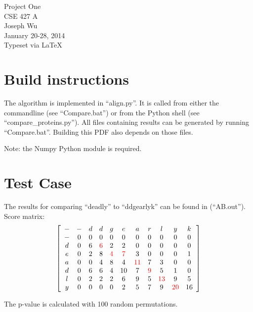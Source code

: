 \documentclass[a4paper, 12pt]{report}
\begin{document}
    \begin{center}
        {\LARGE Project One} \\
        CSE 427 A \\
        Joseph Wu  \\
        January 20-28, 2014 \\
        {\tiny Typeset via \LaTeX}
    \end{center}
    
\section{Build instructions}
    The algorithm is implemented in ``align.py''.  
    It is called from either the commandline (see ``Compare.bat'') 
        or from the Python shell (see ``compare\_proteins.py'').
    All files containing results can be generated by running ``Compare.bat''.
    Building this PDF also depends on those files.
    
    Note: the Numpy Python module is required.
    
\section{Test Case}
    The results for comparing ``deadly'' to ``ddgearlyk'' can be found in (``AB.out'').
    Score matrix:
    \begin{align*}
        \left[ \begin{array}{*{11}{c}}
            - & - & d & d & g &  e &  a & r &  l &  y &  k \\
            - & 0 & 0 & 0 & 0 &  0 &  0 & 0 &  0 &  0 &  0 \\
            d & 0 & 6 & \color{red} 6 & 2 &  2 &  0 & 0 &  0 &  0 &  0 \\
            e & 0 & 2 & 8 & \color{red} 4 &  \color{red} 7 &  3 & 0 &  0 &  0 &  1 \\
            a & 0 & 0 & 4 & 8 &  4 & \color{red} 11 & 7 &  3 &  0 &  0 \\
            d & 0 & 6 & 6 & 4 & 10 &  7 & \color{red} 9 &  5 &  1 &  0 \\
            l & 0 & 2 & 2 & 2 &  6 &  9 & 5 & \color{red} 13 &  9 &  5 \\
            y & 0 & 0 & 0 & 0 &  2 &  5 & 7 &  9 & \color{red} 20 & 16 
        \end{array} \right]
    \end{align*}
    
    
    The p-value is calculated with 100 random permutations.  
    
\end{document}
